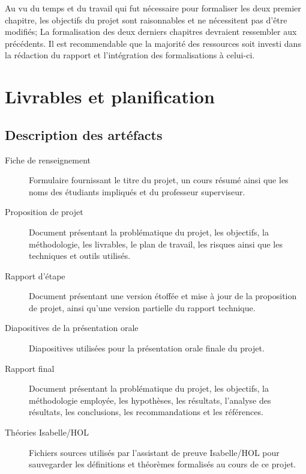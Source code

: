 \documentclass[a4paper, oneside, 12pt, titlepage]{article}
\begin{document}

Au vu du temps et du travail qui fut nécessaire pour formaliser les deux premier chapitre, les
objectifs du projet sont raisonnables et ne nécessitent pas d'être modifiés; La formalisation des
deux derniers chapitres devraient ressembler aux précédents. Il est recommendable que la majorité
des ressources soit investi dans la rédaction du rapport et l'intégration des formalisations à
celui-ci.

\section{Livrables et planification}

\subsection{Description des artéfacts}


\begin{description}
  \item[Fiche de renseignement]
    Formulaire fournissant le titre du projet, un cours résumé ainsi que les noms des étudiants
    impliqués et du professeur superviseur.
  \item[Proposition de projet]
    Document présentant la problématique du projet, les objectifs, la méthodologie, les livrables,
    le plan de travail, les risques ainsi que les techniques et outils utilisés.
  \item[Rapport d'étape]
    Document présentant une version étoffée et mise à jour de la proposition de projet, ainsi qu'une
    version partielle du rapport technique.
  \item[Diapositives de la présentation orale]
    Diapositives utilisées pour la présentation orale finale du projet.
  \item[Rapport final]
    Document présentant la problématique du projet, les objectifs, la méthodologie employée, les
    hypothèses, les résultats, l'analyse des résultats, les conclusions, les recommandations et les
    références.
  \item[Théories Isabelle/HOL]
    Fichiers sources utilisés par l'assistant de preuve Isabelle/HOL pour sauvegarder les
    définitions et théorèmes formalisés au cours de ce projet.
\end{description}
\end{document}
